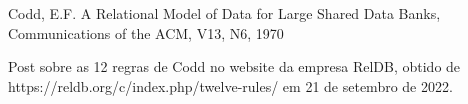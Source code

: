 \documentclass[
12pt,		%
openright,	%
twoside,  %
a4paper,			%
chapter=TITLE,		%
english,			%
french,				%
spanish,			%
brazil				%
]{USPSC-classe/USPSC}
\begin{document}
\begin{flushleft}
\begin{flushleft}
\begin{flushleft}
\begin{flushleft}
\begin{flushleft}
\begin{flushleft}
\begin{flushleft}
\begin{flushleft}
\begin{flushleft}
\begin{flushleft}
[CODD, 1970] Codd, E.F. A Relational Model of Data for Large Shared Data Banks, Communications of the ACM, V13, N6, 1970
\end{flushleft}


\end{flushleft}


\end{flushleft}


\end{flushleft}


\end{flushleft}


\end{flushleft}


\end{flushleft}


\end{flushleft}


\end{flushleft}


\end{flushleft}


\begin{flushleft}
\begin{flushleft}
\begin{flushleft}
\begin{flushleft}
\begin{flushleft}
\begin{flushleft}
\begin{flushleft}
\begin{flushleft}
\begin{flushleft}
\begin{flushleft}
[RelDB, 2019] Post sobre as 12 regras de Codd no website da empresa RelDB, obtido de https://reldb.org/c/index.php/twelve-rules/ em 21 de setembro de 2022.
\end{flushleft}


\end{flushleft}


\end{flushleft}


\end{flushleft}


\end{flushleft}


\end{flushleft}


\end{flushleft}


\end{flushleft}


\end{flushleft}


\end{flushleft}
\end{document}
